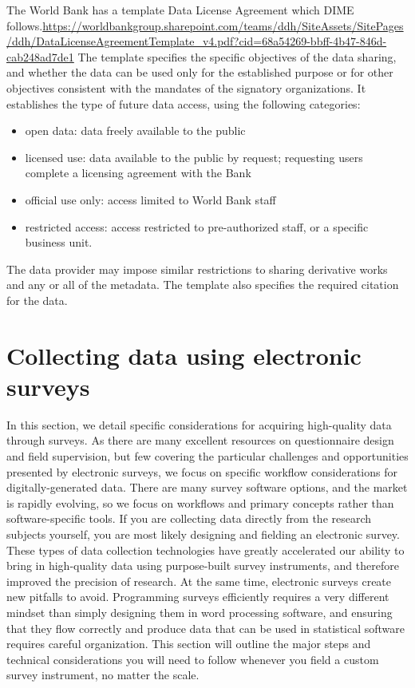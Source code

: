 The World Bank has a template Data License Agreement which DIME follows.{\sidenote \url{https://worldbankgroup.sharepoint.com/teams/ddh/SiteAssets/SitePages/ddh/DataLicenseAgreementTemplate_v4.pdf?cid=68a54269-bbff-4b47-846d-cab248ad7de1}}
The template specifies the specific objectives of the data sharing, 
and whether the data can be used only for the established purpose or for other objectives 
consistent with the mandates of the signatory organizations. 
It establishes the type of future data access, using the following categories:
\begin{itemize}
	\item open data: data freely available to the public
	\item licensed use: data available to the public by request; requesting users complete a licensing agreement with the Bank
	\item official use only: access limited to World Bank staff
	\item restricted access: access restricted to pre-authorized staff, or a specific business unit. 
\end{itemize}
The data provider may impose similar restrictions to sharing derivative works and any or all of the metadata. 
The template also specifies the required citation for the data. 


\section{Collecting data using electronic surveys}
In this section, we detail specific considerations for acquiring high-quality data through surveys.
As there are many excellent resources on questionnaire design and field supervision,
but few covering the particular challenges and opportunities presented by electronic surveys,
we focus on specific workflow considerations for digitally-generated data. 
There are many survey software options, and the market is rapidly evolving,
so we focus on workflows and primary concepts rather than software-specific tools.
If you are collecting data directly from the research subjects yourself,
you are most likely designing and fielding an electronic survey.
These types of data collection technologies
have greatly accelerated our ability to bring in high-quality data
using purpose-built survey instruments,
and therefore improved the precision of research.
At the same time, electronic surveys create new pitfalls to avoid.
Programming surveys efficiently requires a very different mindset
than simply designing them in word processing software,
and ensuring that they flow correctly and produce data
that can be used in statistical software requires careful organization.
This section will outline the major steps and technical considerations
you will need to follow whenever you field a custom survey instrument,
no matter the scale.

